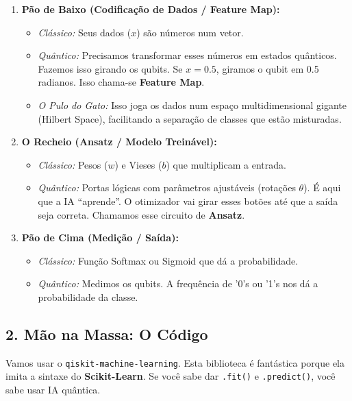 \documentclass[
  brazilian,
]{report}
\providecommand{\tightlist}{%
  \setlength{\itemsep}{0pt}\setlength{\parskip}{0pt}}
\begin{document}
\begin{enumerate}
\def\labelenumi{\arabic{enumi}.}
\tightlist
\item
  \textbf{Pão de Baixo (Codificação de Dados / Feature Map):}

  \begin{itemize}
  \tightlist
  \item
    \emph{Clássico:} Seus dados (\(x\)) são números num vetor.
  \item
    \emph{Quântico:} Precisamos transformar esses números em estados
    quânticos. Fazemos isso girando os qubits. Se \(x=0.5\), giramos o
    qubit em 0.5 radianos. Isso chama-se \textbf{Feature Map}.
  \item
    \emph{O Pulo do Gato:} Isso joga os dados num espaço
    multidimensional gigante (Hilbert Space), facilitando a separação de
    classes que estão misturadas.
  \end{itemize}
\item
  \textbf{O Recheio (Ansatz / Modelo Treinável):}

  \begin{itemize}
  \tightlist
  \item
    \emph{Clássico:} Pesos (\(w\)) e Vieses (\(b\)) que multiplicam a
    entrada.
  \item
    \emph{Quântico:} Portas lógicas com parâmetros ajustáveis (rotações
    \(\theta\)). É aqui que a IA ``aprende''. O otimizador vai girar
    esses botões até que a saída seja correta. Chamamos esse circuito de
    \textbf{Ansatz}.
  \end{itemize}
\item
  \textbf{Pão de Cima (Medição / Saída):}

  \begin{itemize}
  \tightlist
  \item
    \emph{Clássico:} Função Softmax ou Sigmoid que dá a probabilidade.
  \item
    \emph{Quântico:} Medimos os qubits. A frequência de '0's ou '1's nos
    dá a probabilidade da classe.
  \end{itemize}
\end{enumerate}

\subsection{2. Mão na Massa: O
Código}\label{muxe3o-na-massa-o-cuxf3digo}

Vamos usar o \texttt{qiskit-machine-learning}. Esta biblioteca é
fantástica porque ela imita a sintaxe do \textbf{Scikit-Learn}. Se você
sabe dar \texttt{.fit()} e \texttt{.predict()}, você sabe usar IA
quântica.
\end{document}
